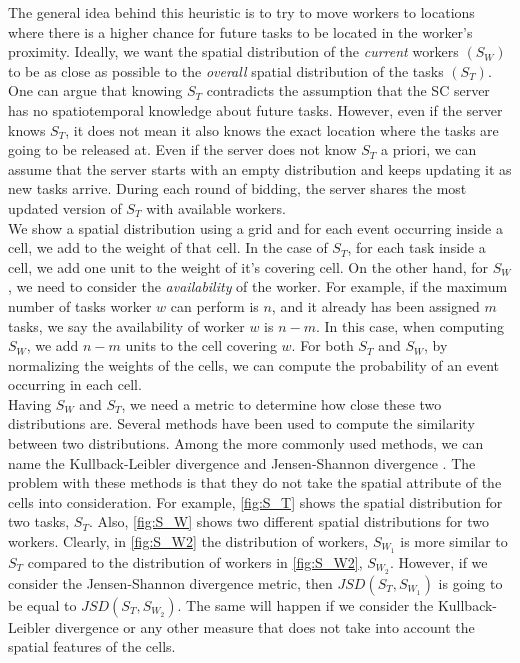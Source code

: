 The general idea behind this heuristic is to try to move workers to locations where there is a higher chance for future tasks to be located in the worker's proximity. Ideally, we want the spatial distribution of the \textit{current} workers $(S_W)$ to be as close as possible to the \textit{overall} spatial distribution of the tasks $(S_T)$.\\
One can argue that knowing $S_T$ contradicts the assumption that the SC server has no spatiotemporal knowledge about future tasks. However, even if the server knows $S_T$, it does not mean it also knows the exact location where the tasks are going to be released at. Even if the server does not know $S_T$ a priori, we can assume that the server starts with an empty distribution and keeps updating it as new tasks arrive. During each round of bidding, the server shares the most updated version of $S_T$ with available workers.\\
We show a spatial distribution using a grid and for each event occurring inside a cell, we add to the weight of that cell. In the case of $S_T$, for each task inside a cell, we add one unit to the weight of it's covering cell. On the other hand, for $S_W$, we need to consider the \textit{availability} of the worker. For example, if the maximum number of tasks worker $w$ can perform is $n$, and it already has been assigned $m$ tasks, we say the availability of worker $w$ is $n-m$. In this case, when computing $S_W$, we add $n-m$ units to the cell covering $w$. For both $S_T$ and $S_W$, by normalizing the weights of the cells, we can compute the probability of an event occurring in each cell.\\
Having $S_W$ and $S_T$, we need a metric to determine how close these two distributions are. Several methods have been used to compute the similarity between two distributions. Among the more commonly used methods, we can name the Kullback-Leibler divergence \cite{Kullback51} and Jensen-Shannon divergence \cite{Lin91}. The problem with these methods is that they do not take the spatial attribute of the cells into consideration. For example, \cref{fig:S_T} shows the spatial distribution for two tasks, $S_T$. Also, \cref{fig:S_W} shows two different spatial distributions for two workers. Clearly, in \cref{fig:S_W2} the distribution of workers, $S_{W_1}$ is more similar to $S_T$ compared to the distribution of workers in \cref{fig:S_W2}, $S_{W_2}$. However, if we consider the Jensen-Shannon divergence metric, then $JSD(S_T, S_{W_1})$ is going to be equal to $JSD(S_T, S_{W_2})$. The same will happen if we consider the Kullback-Leibler divergence or any other measure that does not take into account the spatial features of the cells.\\

